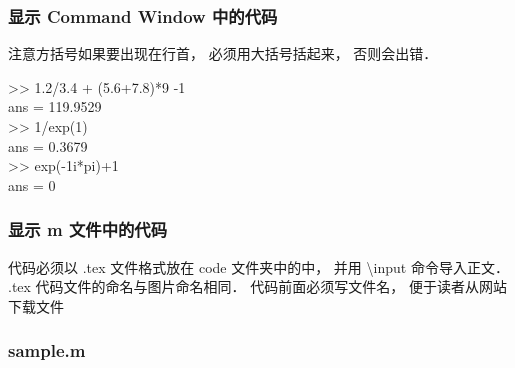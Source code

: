 \subsubsection{显示  Command Window 中的代码}
注意方括号如果要出现在行首， 必须用大括号括起来， 否则会出错．
\begin{Command}
>> 1.2/3.4 + (5.6+7.8)*9 -1 \\
ans = 119.9529 \\
>> 1/exp(1) \\
ans = 0.3679 \\
>> exp(-1i*pi)+1 \\
ans = 0
\end{Command}

\subsubsection{显示 m 文件中的代码}

代码必须以  .tex 文件格式放在 code 文件夹中的中， 并用 \textbackslash input 命令导入正文． .tex 代码文件的命名与图片命名相同． 代码前面必须写文件名， 便于读者从网站下载文件

\subsubsection{sample.m}



